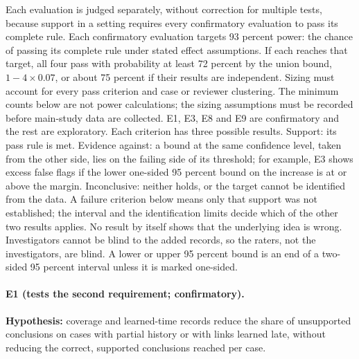 \documentclass[
  11pt,
]{article}
\begin{document}
Each evaluation is judged separately, without correction for multiple
tests, because support in a setting requires every confirmatory
evaluation to pass its complete rule. Each confirmatory evaluation
targets 93 percent power: the chance of passing its complete rule under
stated effect assumptions. If each reaches that target, all four pass
with probability at least 72 percent by the union bound,
\(1-4\times0.07\), or about 75 percent if their results are independent.
Sizing must account for every pass criterion and case or reviewer
clustering. The minimum counts below are not power calculations; the
sizing assumptions must be recorded before main-study data are
collected. E1, E3, E8 and E9 are confirmatory and the rest are
exploratory. Each criterion has three possible results. Support: its
pass rule is met. Evidence against: a bound at the same confidence
level, taken from the other side, lies on the failing side of its
threshold; for example, E3 shows excess false flags if the lower
one-sided 95 percent bound on the increase is at or above the margin.
Inconclusive: neither holds, or the target cannot be identified from the
data. A failure criterion below means only that support was not
established; the interval and the identification limits decide which of
the other two results applies. No result by itself shows that the
underlying idea is wrong. Investigators cannot be blind to the added
records, so the raters, not the investigators, are blind. A lower or
upper 95 percent bound is an end of a two-sided 95 percent interval
unless it is marked one-sided.

\hypertarget{e1-tests-the-second-requirement-confirmatory.}{%
\paragraph{E1 (tests the second requirement;
confirmatory).}\label{e1-tests-the-second-requirement-confirmatory.}}

\textbf{Hypothesis:} coverage and learned-time records reduce the share
of unsupported conclusions on cases with partial history or with links
learned late, without reducing the correct, supported conclusions
reached per case.
\end{document}
